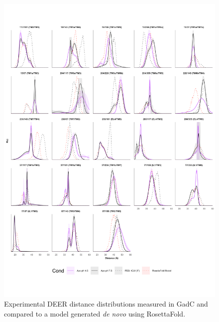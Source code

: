 \begin{figure}[h]
\centering
\includegraphics[width=5.5in]{Figures/gadc_supp_rosettafold.pdf}
\caption[Experimental DEER distance distributions measured in GadC and compared to a model generated \emph{de novo} using RosettaFold.]{Experimental DEER distance distributions measured in GadC and compared to a model generated \emph{de novo} using RosettaFold.}
\label{fig:gadc_supp_rosettafold}
\end{figure}